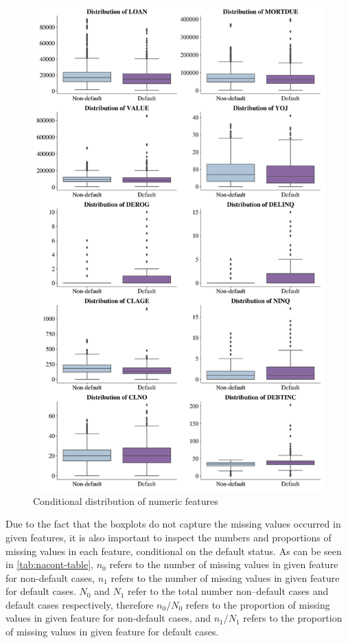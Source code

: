     \begin{figure}[H]
        \centering
        \caption{Conditional distribution of numeric features}\vspace{0.5em}
        \label{fig:boxfeat}
        \includegraphics[width=140mm]{Figures/Numeric_Features_Distribution_Boxplots.jpg}
        \vspace{-1em}
    \end{figure}

    Due to the fact that the boxplots do not capture the missing values occurred in given features, it is also important to inspect the numbers and proportions of missing values in each feature, conditional on the default status.
    As can be seen in \autoref{tab:nacont-table}, $n_0$ refers to the number of missing values in given feature for non-default cases, $n_1$ refers to the number of missing values in given feature for default cases.
    $N_0$ and $N_1$ refer to the total number non--default cases and default cases respectively, therefore $n_0/N_0$ refers to the proportion of missing values in given feature for non-default cases, and $n_1/N_1$ refers to the proportion of missing values in given feature for default cases.

